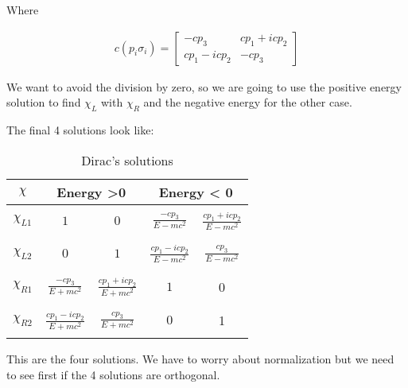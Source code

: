 Where

\begin{equation}
  \begin{array}{c}
    c(p_i\sigma_i) = \begin{bmatrix}
      -cp_3 & cp_1 + icp_2\\
      cp_1 - icp_2 & -cp_3
    \end{bmatrix}
  \end{array}
\end{equation}

We want to avoid the division by zero, so we are going to use the positive energy solution to find $\chi_L$ with $\chi_R$ and the negative energy for the other case.

The final 4 solutions look like:

\begin{table}
  \begin{tabular}{|c|c|c|c|c|}
    \hline

    $\chi$ & \multicolumn{2}{|c|}{Energy >0} & \multicolumn{2}{|c|}{Energy < 0}\\
    \hline
    & & & &\\
    $\chi_{L1}$ & $1$                         & $0$                             & $\frac{-cp_3}{E-mc^2}$            & $\frac{cp_1 +icp_2}{E-mc^2}$ \\
    & & & &\\
    \hline
    & & & &\\
    $\chi_{L2}$& $0$                          & $1$                             & $\frac{cp_1 -icp_2}{E-mc^2}$      & $\frac{cp_3}{E-mc^2}$ \\
    & & & &\\
    \hline
    & & & &\\
    $\chi_{R1}$ & $\frac{-cp_3}{E+mc^2}$      & $\frac{cp_1+icp_2}{E+mc^2}$     & $1$                               & 0 \\
    & & & &\\
    \hline
    & & & &\\
    $\chi_{R2}$ & $\frac{cp_1-icp_2}{E+mc^2}$ & $\frac{cp_3}{E+mc^2}$           & $0$                               & 1 \\
    & & & &\\
    \hline
  \end{tabular}
  \caption{Dirac's solutions}
\end{table}

This are the four solutions. We have to worry about normalization but we need to see first if the 4 solutions are orthogonal.

